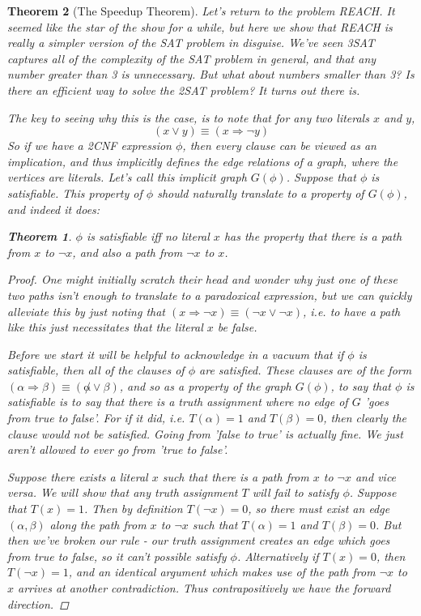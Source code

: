 \documentclass{article}
\theoremstyle{definition}
\theoremstyle{plain}
\theoremstyle{theorem}
\newtheorem{theorem}{Theorem}[section]
\begin{document}
\begin{theorem}[The Speedup Theorem]
Let's return to the problem REACH. It seemed like the star of the show for a while, but here we show that REACH is really a simpler version of the SAT problem in disguise. We've seen 3SAT captures all of the complexity of the SAT problem in general, and that any number greater than 3 is unnecessary. But what about numbers smaller than 3? Is there an efficient way to solve the 2SAT problem? It turns out there is.
\par The key to seeing why this is the case, is to note that for any two literals $x$ and $y$,
\[ (x \vee y) \equiv (x \Rightarrow \neg y)\]
So if we have a 2CNF expression $\phi$, then every clause can be viewed as an implication, and thus implicitly defines the edge relations of a graph, where the vertices are literals. Let's call this implicit graph $G(\phi)$. Suppose that $\phi$ is satisfiable. This property of $\phi$ should naturally translate to a property of $G(\phi)$, and indeed it does:
\begin{theorem}
    $\phi$ is satisfiable iff no literal $x$ has the property that there is a path from $x$ to $\neg x$, and also a path from $\neg x$ to $x$. 
\end{theorem}
\begin{proof}
    One might initially scratch their head and wonder why just one of these two paths isn't enough to translate to a paradoxical expression, but we can quickly alleviate this by just noting that $(x \Rightarrow \neg x) \equiv (\neg x \vee \neg x)$, i.e. to have a path like this just necessitates that the literal $x$ be false.
    \par Before we start it will be helpful to acknowledge in a vacuum that if $\phi$ is satisfiable, then all of the clauses of $\phi$ are satisfied. These clauses are of the form $(\alpha \Rightarrow \beta) \equiv (\not \alpha \vee \beta)$, and so as a property of the graph $G(\phi)$, to say that $\phi$ is satisfiable is to say that there is a truth assignment where no edge of $G$ 'goes from true to false'. For if it did, i.e. $T(\alpha)=1$ and $T(\beta)=0$, then clearly the clause would not be satisfied. Going from 'false to true' is actually fine. We just aren't allowed to ever go from 'true to false'.
    \par Suppose there exists a literal $x$ such that there is a path from $x$ to $\neg x$ and vice versa. We will show that any truth assignment $T$ will fail to satisfy $\phi$. Suppose that $T(x) = 1$. Then by definition $T(\neg x) = 0$, so there must exist an edge $(\alpha,\beta)$ along the path from $x$ to $\neg x$ such that $T(\alpha)=1$ and $T(\beta)=0$. But then we've broken our rule - our truth assignment creates an edge which goes from true to false, so it can't possible satisfy $\phi$. Alternatively if $T(x)=0$, then $T(\neg x)=1$, and an identical argument which makes use of the path from $\neg x$ to $x$ arrives at another contradiction. Thus contrapositively we have the forward direction.

\end{proof}
\end{theorem}
\end{document}
